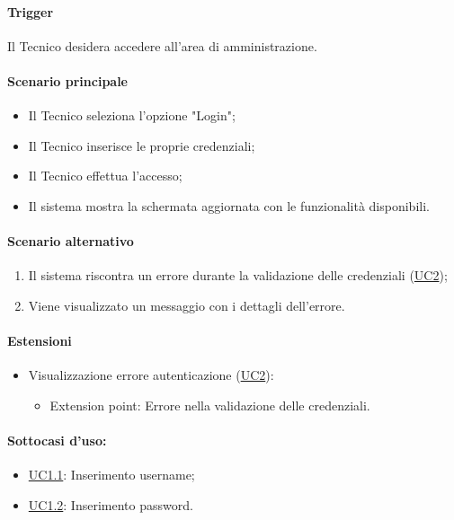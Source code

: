 \paragraph*{Trigger}
Il Tecnico desidera accedere all'area di amministrazione.

\paragraph*{Scenario principale}
\begin{itemize}
  \item Il Tecnico seleziona l'opzione "Login";
  \item Il Tecnico inserisce le proprie credenziali;
  \item Il Tecnico effettua l'accesso;
  \item Il sistema mostra la schermata aggiornata con le funzionalità disponibili.
\end{itemize}

\paragraph*{Scenario alternativo}
\begin{enumerate}
  \item Il sistema riscontra un errore durante la validazione delle credenziali (\hyperref[UC2]{UC2});
  \item Viene visualizzato un messaggio con i dettagli dell'errore.
\end{enumerate}

\paragraph*{Estensioni}
\begin{itemize}
  \item Visualizzazione errore autenticazione (\hyperref[UC2]{UC2}):
  \begin{itemize}
    \item Extension point: Errore nella validazione delle credenziali.
  \end{itemize}
\end{itemize}

\paragraph*{Sottocasi d'uso:}
\begin{itemize}
  \item \hyperref[UC1point1]{UC1.1}: Inserimento username;
  \item \hyperref[UC1point2]{UC1.2}: Inserimento password.
\end{itemize}

